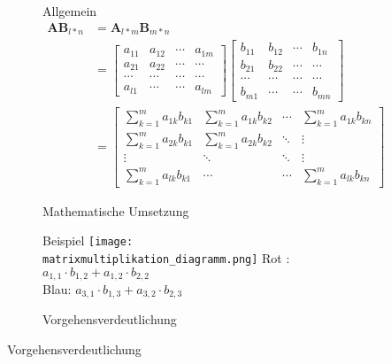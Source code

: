 \documentclass[12pt]{report}
\begin{document}
	\begin{figure}[h]
		\centering
		\begin{subfigure}{.5\textwidth}
		\centering
		Allgemein
  		\begin{align*}
  			\textbf{AB}_{l*n} &= \textbf{A}_{l*m}\textbf{B}_{m*n} \\  			
  			&= \left[ \begin{smallmatrix}
  			a_{11} & a_{12} & \cdots & a_{1m}\\ a_{21} & a_{22} & \cdots & \cdots \\ \cdots & \cdots & \cdots & \cdots\\ a_{l1} & \cdots & \cdots & a_{lm} \end{smallmatrix} \right] \left[ \begin{smallmatrix} 
  			 b_{11} & b_{12} & \cdots & b_{1n}\\ b_{21} & b_{22} & \cdots & \cdots\\ \cdots & \cdots & \cdots & \cdots \\ b_{m1} & \cdots & \cdots & b_{mn} \end{smallmatrix} \right]\\
  			 &= \begin{bmatrix}
  			 \displaystyle\sum_{k=1}^{m} a_{1k}b_{k1} & \displaystyle\sum_{k=1}^{m} a_{1k}b_{k2} & \cdots & \displaystyle\sum_{k=1}^{m} a_{1k}b_{kn} \\
  			 \displaystyle\sum_{k=1}^{m} a_{2k}b_{k1} & \displaystyle\sum_{k=1}^{m} a_{2k}b_{k2} & \ddots & \vdots \\
  			 \vdots & \ddots & \ddots & \vdots \\
  			 \displaystyle\sum_{k=1}^{m} a_{lk}b_{k1} & \cdots & \cdots & \displaystyle\sum_{k=1}^{m} a_{lk}b_{kn} 
  			 \end{bmatrix} \hspace{1cm}
  		\end{align*}
  		\caption{Mathematische Umsetzung}
		\end{subfigure}
		\begin{subfigure}{.3\textwidth}
  		\centering
  		Beispiel
  		\vspace{0.2cm}
 	 	\texttt{[image: matrixmultiplikation\_diagramm.png]}
 	 	\centering
 	 	Rot : $a_{1,1} \cdot b_{1,2} + a_{1,2} \cdot b_{2,2}$\\
 	 	Blau: $a_{3,1} \cdot b_{1,3} + a_{3,2} \cdot b_{2,3}$
 	 	\vspace{1.5cm}
 	 	\caption{Vorgehensverdeutlichung\protect\footnotemark}
		\end{subfigure}
	\end{figure}\\
\end{document}
